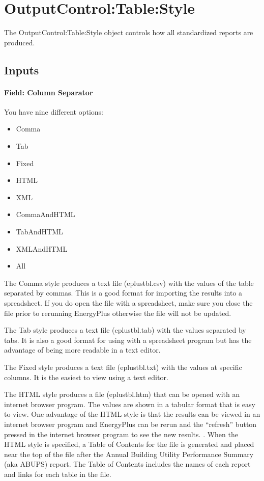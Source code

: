 \section{OutputControl:Table:Style}\label{outputcontroltablestyle}

The OutputControl:Table:Style object controls how all standardized reports are produced.

\subsection{Inputs}\label{inputs-066}

\paragraph{Field: Column Separator}\label{field-column-separator-002}

You have nine different options:

\begin{itemize}
\item
  Comma
\item
  Tab
\item
  Fixed
\item
  HTML
\item
  XML
\item
  CommaAndHTML
\item
  TabAndHTML
\item
  XMLAndHTML
\item
  All
\end{itemize}

The Comma style produces a text file (eplustbl.csv) with the values of the table separated by commas. This is a good format for importing the results into a spreadsheet. If you do open the file with a spreadsheet, make sure you close the file prior to rerunning EnergyPlus otherwise the file will not be updated.

The Tab style produces a text file (eplustbl.tab) with the values separated by tabs. It is also a good format for using with a spreadsheet program but has the advantage of being more readable in a text editor.

The Fixed style produces a text file (eplustbl.txt) with the values at specific columns. It is the easiest to view using a text editor.

The HTML style produces a file (eplustbl.htm) that can be opened with an internet browser program. The values are shown in a tabular format that is easy to view. One advantage of the HTML style is that the results can be viewed in an internet browser program and EnergyPlus can be rerun and the ``refresh'' button pressed in the internet browser program to see the new results. . When the HTML style is specified, a Table of Contents for the file is generated and placed near the top of the file after the Annual Building Utility Performance Summary (aka ABUPS) report. The Table of Contents includes the names of each report and links for each table in the file.

